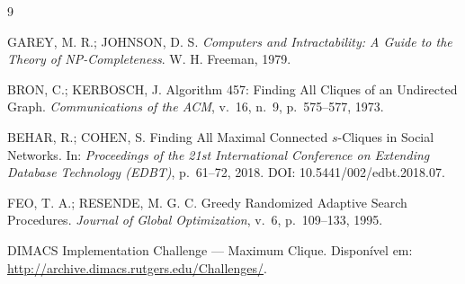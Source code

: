 \documentclass[12pt]{article}
\begin{document}
\begin{thebibliography}{9}

GAREY, M. R.; JOHNSON, D. S.
\emph{Computers and Intractability: A Guide to the Theory of NP-Completeness}.
W. H. Freeman, 1979.

BRON, C.; KERBOSCH, J.
Algorithm 457: Finding All Cliques of an Undirected Graph.
\emph{Communications of the ACM}, v.~16, n.~9, p.~575--577, 1973.

BEHAR, R.; COHEN, S.
Finding All Maximal Connected $s$-Cliques in Social Networks.
In: \emph{Proceedings of the 21st International Conference on Extending Database
Technology (EDBT)}, p.~61--72, 2018. DOI: 10.5441/002/edbt.2018.07.

FEO, T. A.; RESENDE, M. G. C.
Greedy Randomized Adaptive Search Procedures.
\emph{Journal of Global Optimization}, v.~6, p.~109--133, 1995.

DIMACS Implementation Challenge --- Maximum Clique.
Disponível em: \url{http://archive.dimacs.rutgers.edu/Challenges/}.

\end{thebibliography}
\end{document}
